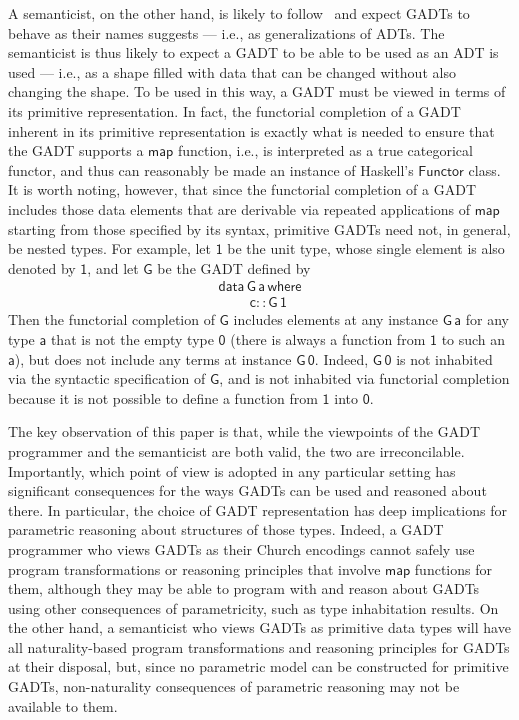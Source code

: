 \documentclass[acmsmall,screen,review,anonymous]{acmart}
\theoremstyle{definition}
\begin{document}
A semanticist, on the other hand, is likely to follow~\cite{bfss90}
and expect GADTs to behave as their names suggests --- i.e., as
generalizations of ADTs. The semanticist is thus likely to expect a
GADT to be able to be used as an ADT is used --- i.e., as a shape
filled with data that can be changed without also changing the
shape. To be used in this way, a GADT must be viewed in terms of its
primitive representation. In fact, the functorial completion of a GADT
inherent in its primitive representation is exactly what is needed to
ensure that the GADT supports a $\mathsf{map}$ function, i.e., is
interpreted as a true categorical functor, and thus can reasonably be
made an instance of Haskell's $\mathsf{Functor}$ class. It is worth
noting, however, that since the functorial completion of a GADT
includes those data elements that are derivable via repeated
applications of $\mathsf{map}$ starting from those specified by its
syntax, primitive GADTs need not, in general, be nested types. For
example, let $\mathsf{1}$ be the unit type, whose single element is
also denoted by $\mathsf{1}$, and let $\mathsf{G}$ be the GADT defined
by
\begin{equation}\label{eq:G}
\begin{array}{l}
\mathsf{data\,G\,a\,where}\\
\mathsf{\;\;\;\;\;\;\;\;c :: G\,1}
\end{array}
\end{equation}
Then the functorial completion of $\mathsf{G}$ includes elements at
any instance $\mathsf{G\,a}$ for any type $\mathsf{a}$ that is not the
empty type $\mathsf{0}$ (there is always a function from $\mathsf{1}$
to such an $\mathsf{a}$), but does not include any terms at instance
$\mathsf{G\,0}$. Indeed, $\mathsf{G\,0}$ is not inhabited via the
syntactic specification of $\mathsf{G}$, and is not inhabited via
functorial completion because it is not possible to define a function
from $\mathsf{1}$ into $\mathsf{0}$.

The key observation of this paper is that, while the viewpoints of the
GADT programmer and the semanticist are both valid, the two are
irreconcilable. Importantly, which point of view is adopted in any
particular setting has significant consequences for the ways GADTs can
be used and reasoned about there. In particular, the choice of GADT
representation has deep implications for parametric reasoning about
structures of those types. Indeed, a GADT programmer who views GADTs
as their Church encodings cannot safely use program transformations or
reasoning principles that involve $\mathsf{map}$ functions for them,
although they may be able to program with and reason about GADTs using
other consequences of parametricity, such as type inhabitation
results. On the other hand, a semanticist who views GADTs as primitive
data types will have all naturality-based program transformations and
reasoning principles for GADTs at their disposal, but, since no
parametric model can be constructed for primitive GADTs,
non-naturality consequences of parametric reasoning may not be
available to them.
\end{document}
